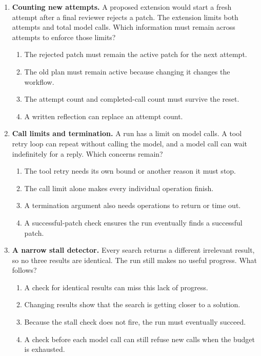 \begin{enumerate}[start=21,itemsep=0.7\baselineskip]
\item\label{exercise:27} \begin{minipage}[t]{\linewidth}
\textbf{Counting new attempts.} A proposed extension would start a fresh attempt after a final reviewer rejects a patch. The extension limits both attempts and total model calls. Which information must remain across attempts to enforce those limits?
\begin{enumerate}[label=\textnormal{(\Alph*)},leftmargin=*,itemsep=0pt]
\item The rejected patch must remain the active patch for the next attempt.
\item The old plan must remain active because changing it changes the workflow.
\item The attempt count and completed-call count must survive the reset.
\item A written reflection can replace an attempt count.
\end{enumerate}
\end{minipage}

\item\label{exercise:28} \begin{minipage}[t]{\linewidth}
\textbf{Call limits and termination.} A run has a limit on model calls. A tool retry loop can repeat without calling the model, and a model call can wait indefinitely for a reply. Which concerns remain?
\begin{enumerate}[label=\textnormal{(\Alph*)},leftmargin=*,itemsep=0pt]
\item The tool retry needs its own bound or another reason it must stop.
\item The call limit alone makes every individual operation finish.
\item A termination argument also needs operations to return or time out.
\item A successful-patch check ensures the run eventually finds a successful patch.
\end{enumerate}
\end{minipage}

\item\label{exercise:29} \begin{minipage}[t]{\linewidth}
\textbf{A narrow stall detector.} Every search returns a different irrelevant result, so no three results are identical. The run still makes no useful progress. What follows?
\begin{enumerate}[label=\textnormal{(\Alph*)},leftmargin=*,itemsep=0pt]
\item A check for identical results can miss this lack of progress.
\item Changing results show that the search is getting closer to a solution.
\item Because the stall check does not fire, the run must eventually succeed.
\item A check before each model call can still refuse new calls when the budget is exhausted.
\end{enumerate}
\end{minipage}


\end{enumerate}
